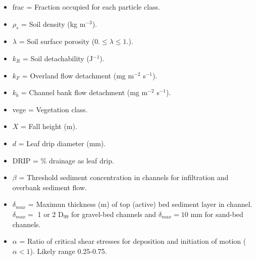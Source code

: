 \documentclass{beamer}
\begin{document}
\begin{frame}
\begin{columns}
{\begin{itemize}[label={}]
\item frac = Fraction occupied for each particle class.
\item $\rho_s$ =  Soil density (kg m$^{-3}$).
\item $\lambda$ = Soil surface porosity ($0. \leq \lambda \leq 1.$).
\item $k_R$ = Soil detachability  (J$^{-1}$).
\item $k_F$ = Overland flow detachment (mg m$^{-2}$ s$^{-1}$).
\item $k_b$ = Channel bank flow detachment (mg m$^{-2}$ s$^{-1}$).
\item vege = Vegetation class.
\item $X$ =  Fall height (m).
\item $d$ = Leaf drip diameter (mm).
\item DRIP = \% drainage as leaf drip.
\item $\beta$ = Threshold sediment concentration in channels for infiltration and overbank sediment flow.
\item $\delta_{max}$ = Maximun thickness (m) of top (active) bed sediment layer in channel. $\delta_{max} = $ 1 or 2 D$_99$ for gravel-bed channels and $\delta_{max} = 10$ mm for sand-bed channels.
\item $\alpha$ = Ratio of critical shear stresses for deposition and initiation of motion ($\alpha < 1$). Likely range 0.25-0.75.
\end{itemize}
}
\end{columns}
\end{frame}
\end{document}
